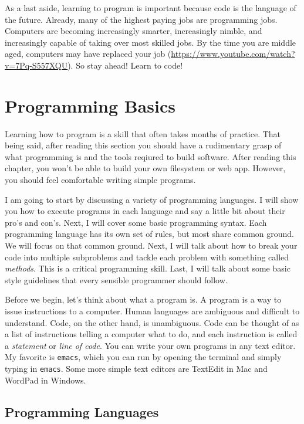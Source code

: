 \documentclass[a4paper]{article}
\begin{document}
As a last aside, learning to program is important because code is the language of the future. Already, many of the highest paying jobs are programming jobs. Computers are becoming increasingly smarter, increasingly nimble, and increasingly capable of taking over most skilled jobs. By the time you are middle aged, computers may have replaced your job (\url{https://www.youtube.com/watch?v=7Pq-S557XQU}). So stay ahead! Learn to code!

\section{Programming Basics}

Learning how to program is a skill that often takes months of practice. That being said, after reading this section you should have a rudimentary grasp of what programming is and the tools reqiured to build software. After reading this chapter, you won't be able to build your own filesystem or web app. However, you should feel comfortable writing simple programs.

I am going to start by discussing a variety of programming languages. I will show you how to execute programs in each language and say a little bit about their pro's and con's. Next, I will cover some basic programming syntax. Each programming language has its own set of rules, but most share common ground. We will focus on that common ground. Next, I will talk about how to break your code into multiple subproblems and tackle each problem with something called {\it methods}. This is a critical programming skill. Last, I will talk about some basic style guidelines that every sensible programmer should follow.

Before we begin, let's think about what a program is. A program is a way to issue instructions to a computer. Human languages are ambiguous and difficult to understand. Code, on the other hand, is unambiguous. Code can be thought of as a list of instructions telling a computer what to do, and each instruction is called a {\it statement} or {\it line of code}. You can write your own programs in any text editor. My favorite is \texttt{emacs}, which you can run by opening the terminal and simply typing in \texttt{emacs}. Some more simple text editors are TextEdit in Mac and WordPad in Windows.

\subsection{Programming Languages}
\end{document}
